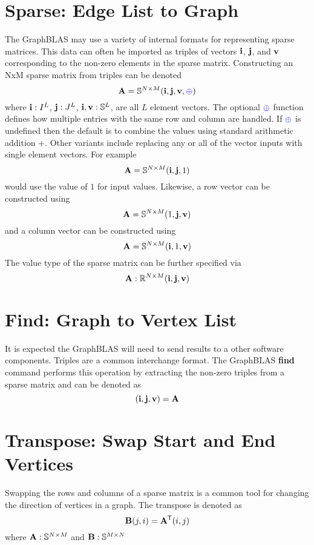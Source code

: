 \section{Sparse: Edge List to Graph}
  The GraphBLAS may use a variety of internal formats for representing sparse matrices.  This data can often be imported as triples of vectors ${\bf i}$, ${\bf j}$, and ${\bf v}$ corresponding to the non-zero elements in the sparse matrix.  Constructing an NxM sparse matrix from triples can be denoted
$$
   \mathbf{A} = \mathbb{S}^{N \times M}({\bf i},{\bf j},{\bf v},{\textcolor{blue}{\oplus}})
$$
where ${\bf i} : I^L$, ${\bf j}: J^L$, ${\bf i}, {\bf v}: \mathbb{S}^L$, are all $L$ element vectors.  The optional  ${\textcolor{blue}{\oplus}}$ function defines how multiple entries with the same row and column are handled.  If ${\textcolor{blue}{\oplus}}$ is undefined then the default is to combine the values using standard arithmetic addition $+$.  Other variants include replacing any or all of the vector inputs with single element vectors.  For example
$$
   \mathbf{A} = \mathbb{S}^{N \times M}({\bf i},{\bf j},1)
$$
would use the value of $1$ for input values.  Likewise, a row vector can be constructed using
$$
   \mathbf{A} = \mathbb{S}^{N \times M}(1,{\bf j},{\bf v})
$$
and a column vector can be constructed using
$$
   \mathbf{A} = \mathbb{S}^{N \times M}({\bf i},1,{\bf v})
$$
The value type of the sparse matrix can be further specified via
$$
   \mathbf{A}: \mathbb{R}^{N \times M}({\bf i},{\bf j},{\bf v})
$$

\section{Find: Graph to Vertex List}
  It is expected the GraphBLAS will need to send results to a other software components.  Triples are a common interchange format.  The GraphBLAS {\bf find} command performs this operation by extracting the non-zero triples from a sparse matrix and can be denoted as
$$
	({\bf i},{\bf j},{\bf v}) = {\bf A}
$$

\section{Transpose: Swap Start and End Vertices}
  Swapping the rows and columns of a sparse matrix is a common tool for changing the direction of vertices in a graph.  The transpose is denoted as
$$
     {\bf B}(j,i) = {\bf A}^{\sf T}(i,j)
$$   
where ${\bf A}:\mathbb{S}^{N \times M}$ and ${\bf B}:\mathbb{S}^{M \times N}$

